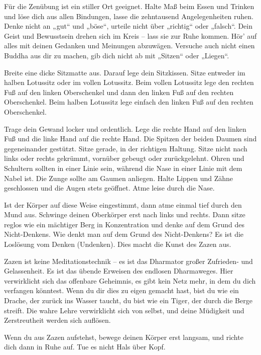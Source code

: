 \documentclass[10pt,a4paper]{article}
\begin{document}
\vskip 4pt
Für die Zenübung ist ein stiller Ort geeignet. Halte Maß beim Essen und Trinken und löse dich aus allen
Bindungen, lasse die zehntausend Angelegenheiten ruhen. Denke nicht an „gut“ und „böse“, urteile nicht über
„richtig“ oder „falsch“. Dein Geist und Bewusstsein drehen sich im Kreis – lass sie zur Ruhe kommen. Hör’ auf alles
mit deinen Gedanken und Meinungen abzuwägen. Versuche auch nicht einen Buddha aus dir zu machen, gib dich
nicht ab mit „Sitzen“ oder „Liegen“.

\vskip 4pt
Breite eine dicke Sitzmatte aus. Darauf lege dein Sitzkissen. Sitze entweder im halben Lotussitz oder im vollen
Lotussitz. Beim vollen Lotussitz lege den rechten Fuß auf den linken Oberschenkel und dann den linken Fuß auf
den rechten Oberschenkel. Beim halben Lotussitz lege einfach den linken Fuß auf den rechten Oberschenkel.

\vskip 4pt
Trage dein Gewand locker und ordentlich. Lege die rechte Hand auf den linken Fuß und die linke Hand auf die
rechte Hand. Die Spitzen der beiden Daumen sind gegeneinander gestützt. Sitze gerade, in der richtigen Haltung.
Sitze nicht nach links oder rechts gekrümmt, vornüber gebeugt oder zurückgelehnt. Ohren und Schultern sollten
in einer Linie sein, während die Nase in einer Linie mit dem Nabel ist. Die Zunge sollte am Gaumen anliegen. Halte
Lippen und Zähne geschlossen und die Augen stets geöffnet. Atme leise durch die Nase.

\vskip 4pt
Ist der Körper auf diese Weise eingestimmt, dann atme einmal tief durch den Mund aus. Schwinge deinen
Oberkörper erst nach links und rechts. Dann sitze reglos wie ein mächtiger Berg in Konzentration und denke auf
dem Grund des Nicht-Denkens. Wie denkt man auf dem Grund des Nicht-Denkens? Es ist die Loslösung vom
Denken (Undenken). Dies macht die Kunst des Zazen aus.

\vskip 4pt
Zazen ist keine Meditationstechnik – es ist das Dharmator großer Zufrieden- und Gelassenheit. Es ist das übende
Erweisen des endlosen Dharmaweges. Hier verwirklicht sich das offenbare Geheimnis, es gibt kein Netz mehr, in
dem du dich verfangen könntest. Wenn du dir dies zu eigen gemacht hast, bist du wie ein Drache, der zurück ins
Wasser taucht, du bist wie ein Tiger, der durch die Berge streift. Die wahre Lehre verwirklicht sich von selbst, und
deine Müdigkeit und Zerstreutheit werden sich auflösen.

\vskip 4pt
Wenn du aus Zazen aufstehst, bewege deinen Körper erst langsam, und richte dich dann in Ruhe auf. Tue es nicht
Hals über Kopf.
\end{document}
